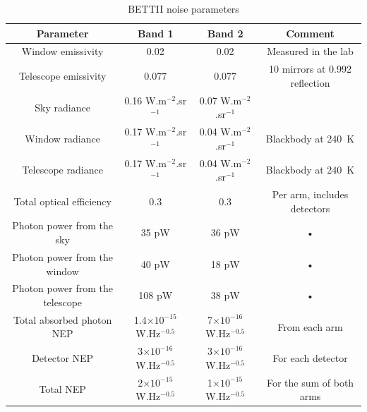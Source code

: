 \begin{table}[ht!]
\begin{center}
\begin{tabular}{|c|c|c|c|}
\hline 
\textbf{Parameter} & \textbf{Band 1} & \textbf{Band 2} & \textbf{Comment} \\ 
\hline 
Window emissivity & 0.02 & 0.02 & Measured in the lab \\ 
\hline 
Telescope emissivity & 0.077 & 0.077 & 10 mirrors at 0.992 reflection\\ 
\hline 
Sky radiance & 0.16 W.m$^{-2}$.sr$^{-1}$ & 0.07 W.m$^{-2}$.sr$^{-1}$ & \cite{Harries:1980cva} \\ 
\hline 
Window radiance & 0.17 W.m$^{-2}$.sr$^{-1}$ & 0.04 W.m$^{-2}$.sr$^{-1}$ & Blackbody at 240~K \\ 
\hline 
Telescope radiance & 0.17 W.m$^{-2}$.sr$^{-1}$ & 0.04 W.m$^{-2}$.sr$^{-1}$ & Blackbody at 240~K \\ 
\hline 
Total optical efficiency & 0.3 & 0.3 & Per arm, includes detectors \\ 
\hline 
Photon power from the sky & 35 pW & 36 pW & • \\ 
\hline 
Photon power from the window & 40 pW &  18 pW & • \\ 
\hline 
Photon power from the telescope & 108 pW & 38 pW & • \\ 
\hline 
Total absorbed photon NEP & 1.4$\times 10^{-15}$ W.Hz$^{-0.5}$ & 7$\times 10^{-16}$ W.Hz$^{-0.5}$ & From each arm \\ 
\hline 
Detector NEP & 3$\times 10^{-16}$ W.Hz$^{-0.5}$ & 3$\times 10^{-16}$ W.Hz$^{-0.5}$ & For each detector \\ 
\hline 
Total NEP & 2$\times 10^{-15}$ W.Hz$^{-0.5}$ & 1$\times 10^{-15}$ W.Hz$^{-0.5}$ & For the sum of both arms \\ 
\hline 
\end{tabular} 
\caption{BETTII noise parameters}
\label{tab:noise}
\end{center}
\end{table} 



